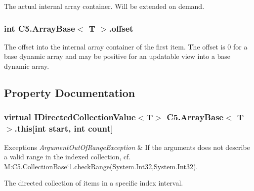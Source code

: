 The actual internal array container. Will be extended on demand. 

\hypertarget{class_c5_1_1_array_base_a2fff33ea372907c015262a3041b2f2af}{}
\subsubsection[{offset}]{\setlength{\rightskip}{0pt plus 5cm}int {\bf C5.\+Array\+Base}$<$ T $>$.offset\hspace{0.3cm}{\ttfamily [protected]}}\label{class_c5_1_1_array_base_a2fff33ea372907c015262a3041b2f2af}


The offset into the internal array container of the first item. The offset is 0 for a base dynamic array and may be positive for an updatable view into a base dynamic array. 



\subsection{Property Documentation}
\hypertarget{class_c5_1_1_array_base_a20e7840830115ed99dbd9054d714f7c7}{}
\subsubsection[{this[int start, int count]}]{\setlength{\rightskip}{0pt plus 5cm}virtual {\bf I\+Directed\+Collection\+Value}$<$T$>$ {\bf C5.\+Array\+Base}$<$ T $>$.this\mbox{[}int start, int count\mbox{]}\hspace{0.3cm}{\ttfamily [get]}}\label{class_c5_1_1_array_base_a20e7840830115ed99dbd9054d714f7c7}





\begin{DoxyExceptions}{Exceptions}
{\em Argument\+Out\+Of\+Range\+Exception} & If the arguments does not describe a valid range in the indexed collection, cf. M\+:\+C5.\+Collection\+Base`1.\+check\+Range(\+System.\+Int32,\+System.\+Int32).\\
\hline
\end{DoxyExceptions}


The directed collection of items in a specific index interval.


